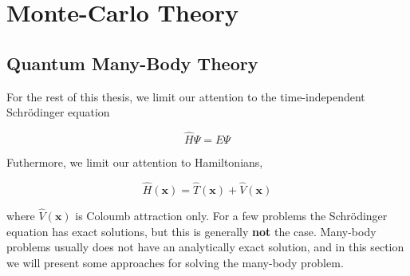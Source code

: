 \chapter{Monte-Carlo Theory}



\section{Quantum Many-Body Theory}

For the rest of this thesis, we limit our attention to the
time-independent Schr\"{o}dinger equation

\begin{equation*} 
  \hat{H} \Psi = E \Psi
\end{equation*}

Futhermore, we limit our attention to Hamiltonians,

\begin{equation}
  \hat{H}(\mathbf{x}) = \hat{T}(\mathbf{x}) + \hat{V}(\mathbf{x})
\end{equation}

where $\hat{V}(\mathbf{x})$ is Coloumb attraction only.
For a few problems the Schr\"odinger equation has exact solutions, but
this is generally {\bf not} the case. Many-body problems usually does
not have an analytically exact solution, and in this section we will
present some approaches for solving the many-body problem.
